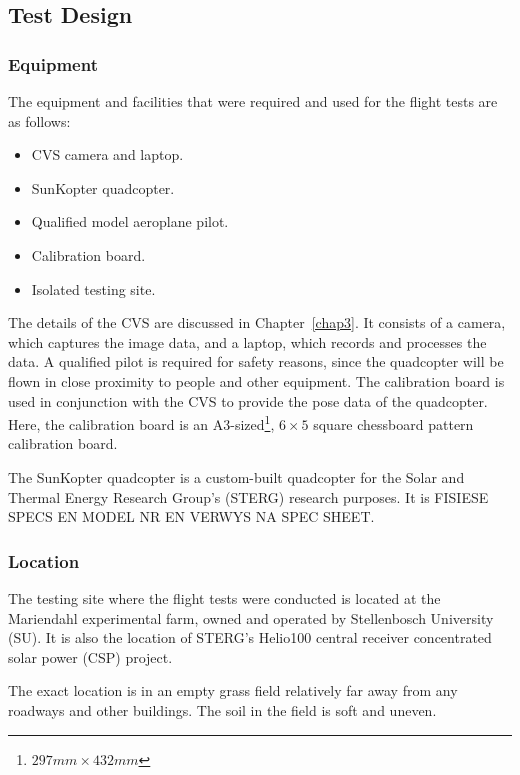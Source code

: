\subsection{Test Design}

\subsubsection{Equipment}

The equipment and facilities that were required and used for the flight tests are as follows:

\begin{itemize}
    \item CVS camera and laptop.
    \item SunKopter quadcopter.
    \item Qualified model aeroplane pilot.
    \item Calibration board.
    \item Isolated testing site. 
\end{itemize}

The details of the CVS are discussed in Chapter~\ref{chap3}. It consists of a camera, which captures the image data, and a laptop, which records and processes the data. A qualified pilot is required for safety reasons, since the quadcopter will be flown in close proximity to people and other equipment. The calibration board is used in conjunction with the CVS to provide the pose data of the quadcopter. Here, the calibration board is an A3-sized\footnote{$297mm\times432mm$}, $6\times5$ square chessboard pattern calibration board. 

The SunKopter quadcopter is a custom-built quadcopter for the Solar and Thermal Energy Research Group's (STERG) research purposes. It is FISIESE SPECS EN MODEL NR EN VERWYS NA SPEC SHEET\@.

\subsubsection{Location}

The testing site where the flight tests were conducted is located at the Mariendahl experimental farm, owned and operated by Stellenbosch University (SU). It is also the location of STERG's Helio100 central receiver concentrated solar power (CSP) project. 

The exact location is in an empty grass field relatively far away from any roadways and other buildings. The soil in the field is soft and uneven. 

